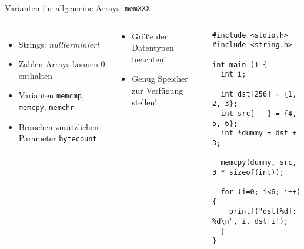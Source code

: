 \begin{frame}[fragile]{Varianten für allgemeine Arrays: \texttt{memXXX}}
%
\begin{columns}[T]
\begin{itemize}
\item Strings: \emph{nullterminiert}
\item Zahlen-Arrays können 0 enthalten
\item Varianten \texttt{memcmp}, \texttt{memcpy}, \texttt{memchr}
\item Brauchen zusätzlichen Parameter \texttt{bytecount}
\end{itemize}
%
\begin{warnbox}
\begin{itemize}
\item Größe der Datentypen beachten!
\item Genug Speicher zur Verfügung stellen!
\end{itemize}
\end{warnbox}
%
\begin{codebox}
\begin{verbatim}
#include <stdio.h>
#include <string.h>

int main () {
  int i;
   
  int dst[256] = {1, 2, 3};
  int src[   ] = {4, 5, 6};
  int *dummy = dst + 3;
   
  memcpy(dummy, src, 3 * sizeof(int));
   
  for (i=0; i<6; i++) {
    printf("dst[%d]: %d\n", i, dst[i]);
  }
}
\end{verbatim}
\end{codebox}
\end{columns}
%
\end{frame}


